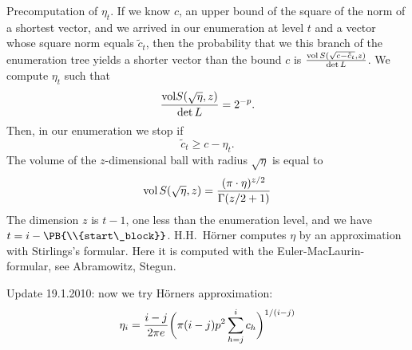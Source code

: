 Precomputation of $\eta_t$.
If we know $c$, an upper bound of the square of the norm
of a shortest vector, and
we arrived in our enumeration at level $t$ and a vector whose square norm
equals $\tilde{c}_t$, then the probability that we this branch of the
enumeration tree yields a shorter vector than the bound $c$
is
${{\rm vol}\,S(\sqrt{c-\tilde{c}_t},z)\over \det L }
$.
We compute $\eta_t$ such that
$$
{{\rm vol}S(\sqrt{\eta},z)\over \det L } = 2^{-p}.
$$
Then, in our enumeration we stop if
$$
\tilde{c}_t\ge c -\eta_t.
$$
The volume of the $z$-dimensional ball with radius $\sqrt{\eta}$
is equal to
$$
\hbox{vol}\,S(\sqrt{\eta},z)=
{(\pi\cdot\eta)^{z/2}\over \Gamma(z/2+1)}
$$
The dimension $z$ is $t-1$, one less than the enumeration level, and
we have $t=i-\PB{\\{start\_block}}$.
H.H.~H\"orner computes $\eta$ by an approximation
with Stirlings's formular. Here it is computed with the %
Euler-MacLaurin-formular, see
Abramowitz, Stegun.

Update 19.1.2010:
now we try H\"orners approximation:
$$
\eta_i = {i-j\over 2\pi e}\biggl(\pi(i-j)p^2\sum_{h=j}^i c_h\biggr)^{1/(i-j)}
$$

